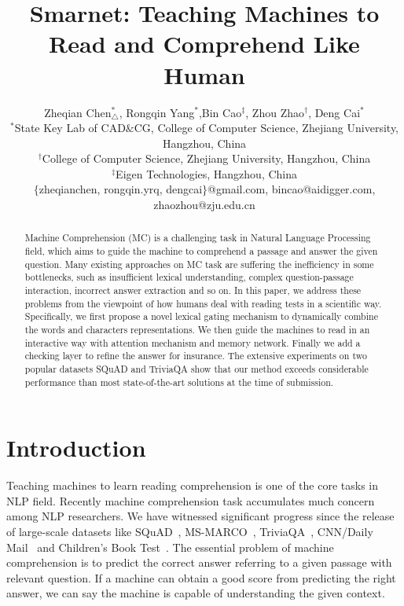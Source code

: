\documentclass[letterpaper]{article} \usepackage{aaai18}  \usepackage{times}  \usepackage{helvet}  \usepackage{courier}  \usepackage{url}  \usepackage{graphicx}  \usepackage{booktabs}
\begin{document}
\title{Smarnet: Teaching Machines to Read and Comprehend Like Human}
\author{
	Zheqian Chen$^*_{\bigtriangleup}$, Rongqin Yang$^*$,Bin Cao$^\ddagger$, Zhou Zhao$^\dag$,  Deng Cai$^*$\\
	$^*$State Key Lab of CAD$\&$CG, College of Computer Science, Zhejiang University, Hangzhou, China\\
	$^\dag$College of Computer Science, Zhejiang University, Hangzhou, China\\
	$^\ddagger$Eigen Technologies, Hangzhou, China\\
	$\{$zheqianchen, rongqin.yrq, dengcai$\}$@gmail.com, bincao@aidigger.com, zhaozhou@zju.edu.cn \\
}
\maketitle

\begin{abstract}
Machine Comprehension (MC) is a challenging task in Natural Language Processing field, which aims to guide the machine to comprehend a passage and answer the given question. Many existing approaches on MC task are suffering the inefficiency in some bottlenecks, such as insufficient lexical understanding, complex question-passage interaction, incorrect answer extraction and so on. In this paper, we address these problems from the viewpoint of how humans deal with reading tests in a scientific way. Specifically, we first propose a novel lexical gating mechanism to dynamically combine the words and characters representations. We then guide the machines to read in an interactive way with attention mechanism and memory network. Finally we add a checking layer to refine the answer for insurance. The extensive experiments on two popular datasets SQuAD and TriviaQA show that our method exceeds considerable performance than most state-of-the-art solutions at the time of submission. 
\end{abstract}

\section{Introduction}
Teaching machines to learn reading comprehension is one of the core tasks in NLP field. Recently machine comprehension task accumulates much concern among NLP researchers. We have witnessed significant progress since the release of large-scale datasets like SQuAD~\cite{rajpurkar2016squad}, MS-MARCO~\cite{Nguyen2016MS}, TriviaQA~\cite{Joshi2017TriviaQAAL}, CNN/Daily Mail~\cite{Hermann2015TeachingMT} and Children's Book Test~\cite{Hill2015The}. The essential problem of machine comprehension is to predict the correct answer referring to a given passage with relevant question. If a machine can obtain a good score from predicting the right answer, we can say the machine is capable of understanding the given context.
\end{document}
